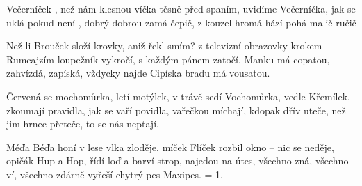 \begin{TEXT}{Večerníček}
\SLOKA {}, než nám klesnou víčka těsně před spaním,
uvidíme Večerníčka, jak se uklá
pokud  není , dobrý  dobrou 
zamá čepič,
z kouzel hromá hází  pohá 
malič ručič

\SLOKA Než-li Brouček složí krovky, aniž řekl smím?
z televizní obrazovky krokem Rumcajzím
loupežník vykročí, s každým pánem zatočí,
Manku má copatou,
zahvízdá, zapíská, vždycky najde Cipíska
bradu má vousatou.

\SLOKA Červená se mochomůrka, letí motýlek,
v trávě sedí Vochomůrka, vedle Křemílek,
zkoumají pravidla, jak se vaří povidla,
vařečkou míchají,
kdopak dřív uteče, než jim hrnec přeteče,
to se nás neptají.

\SLOKA Méďa Béďa honí v lese vlka zloděje,
míček Flíček rozbil okno -- nic se neděje,
opičák Hup a Hop, řídí loď a barví strop,
najedou na útes,
všechno zná, všechno ví,
všechno zdárně vyřeší
chytrý pes Maxipes.
\SLOKA = 1.
\end{TEXT}